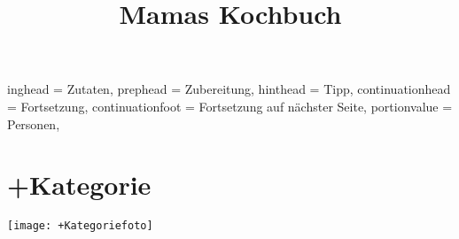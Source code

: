 \documentclass[%
a4paper,
11pt
]{article}
\begin{document}
\title{Mamas Kochbuch}

\maketitle

\setHeadlines
{%
    inghead = Zutaten,
    prephead = Zubereitung,
    hinthead = Tipp,
    continuationhead = Fortsetzung,
    continuationfoot = Fortsetzung auf n\"achster Seite,
    portionvalue = Personen,
}


\tableofcontents

\vspace{5em}
\newpage
\section{+Kategorie}  

\begin{center}
\texttt{[image: +Kategoriefoto]}
\end{center}


\end{document}
